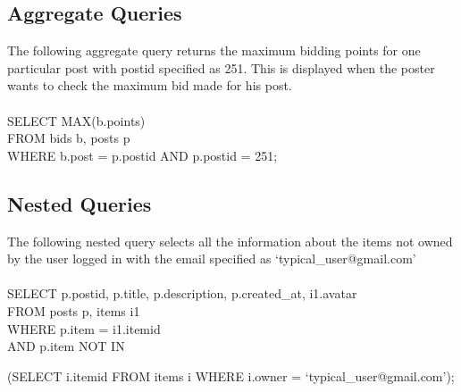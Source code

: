 \subsection{Aggregate Queries}
The following aggregate query returns the maximum bidding points for one particular post with postid specified as 251. This is displayed when the poster wants to check the maximum bid made for his post.\\\\
SELECT MAX(b.points)\\
FROM bids b, posts p\\
WHERE b.post = p.postid AND p.postid = 251;

\subsection{Nested Queries}
The following nested query selects all the information about the items not owned by the user logged in with the email specified as `typical\_user@gmail.com'\\\\
SELECT p.postid, p.title, p.description, p.created\_at, i1.avatar \\
FROM posts p, items i1 \\
WHERE p.item = i1.itemid\\
AND p.item NOT IN \\
\strut\hspace*{3ex} (SELECT i.itemid FROM items i WHERE i.owner = `typical\_user@gmail.com');

